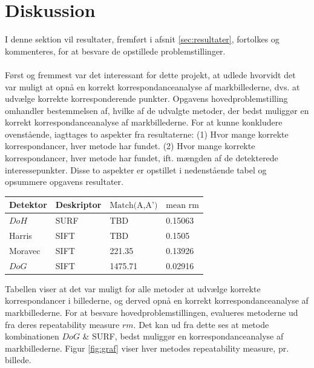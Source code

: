 \chapter{Diskussion}
I denne sektion vil resultater, fremført i afsnit \ref{sec:resultater}, fortolkes og kommenteres, for at besvare de opstillede problemstillinger. \\ \\
Først og fremmest var det interessant for dette projekt, at udlede hvorvidt det var muligt at opnå en korrekt korrespondanceanalyse af markbillederne, dvs. at udvælge korrekte korresponderende punkter. Opgavens hovedproblemstilling omhandler bestemmelsen af, hvilke af de udvalgte metoder, der bedst muliggør en korrekt korrespondanceanalyse af markbillederne. For at kunne konkludere ovenstående, iagttages to aspekter fra resultaterne: (1) Hvor mange korrekte korrespondancer, hver metode har fundet. (2) Hvor mange korrekte korrespondancer, hver metode har fundet, ift. mængden af de detekterede interessepunkter. Disse to aspekter er opstillet i nedenstående tabel og opsummere opgavens resultater.
\begin{center}
    \begin{tabular}{ | l | l | l | l |}
    \hline
    Detektor & Deskriptor & $\text{Match(A,A')}$ & $\text{mean rm}$ \\ \hline
    $DoH$ & SURF & TBD & 0.15063 \\ \hline  
    Harris & SIFT & TBD & 0.1505 \\ \hline    
    Moravec & SIFT & 221.35 & 0.13926 \\ \hline    
    $DoG$ & SIFT & 1475.71 & 0.02916 \\ \hline         
    \end{tabular}
    \label{table:tab}
\end{center}
Tabellen viser at det var muligt for alle metoder at udvælge korrekte korrespondancer i billederne, og derved opnå en korrekt korrespondanceanalyse af markbillederne. For at besvare hovedproblemstillingen, evalueres metoderne ud fra deres repeatability measure $rm$. Det kan ud fra dette ses at metode kombinationen $DoG$ \& SURF, bedst muliggør en korrespondanceanalyse af markbillederne. Figur \ref{fig:graf} viser hver metodes repeatability measure, pr. billede.
